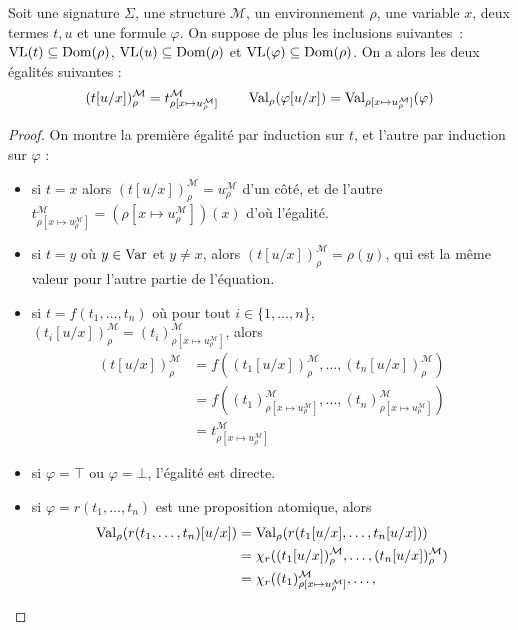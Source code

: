 \begin{proposition}\label{prop.comm.subst.env}
  Soit une signature $\Sigma$, une structure $\mathcal M$, un environnement
  $\rho$, une variable $x$, deux termes $t,u$ et une formule $\varphi$. On
  suppose de plus les inclusions suivantes~: $\operatorname{VL}(t)\subseteq \operatorname{Dom}(\rho)$,
  $\operatorname{VL}(u)\subseteq\operatorname{Dom}(\rho)$ et $\operatorname{VL}(\varphi)\subseteq\operatorname{Dom}(\rho)$. On a alors
  les deux égalités suivantes :
  \[(t[u/x])_\rho^\mathcal M = t^\mathcal M_{\rho[x \mapsto u^\mathcal M_\rho]} \qquad
  \operatorname{Val}_\rho(\varphi[u/x]) = \operatorname{Val}_{\rho[x\mapsto u^\mathcal M_\rho]}(\varphi)\]
\end{proposition}

\begin{proof}
  On montre la première égalité par induction sur $t$, et l'autre par induction
  sur $\varphi$ :
  \begin{itemize}
  \item si $t = x$ alors $(t[u/x])_\rho^\mathcal M = u^\mathcal M_\rho$ d'un côté,
    et de l'autre
    $t^\mathcal M_{\rho[x\mapsto u_\rho^\mathcal M]} =
    (\rho[x\mapsto u_\rho^\mathcal M])(x)$
    d'où l'égalité.
  \item si $t = y$ où $y\in\operatorname{Var}$ et $y\neq x$, alors
    $(t[u/x])_\rho^\mathcal M = \rho(y)$, qui est la même valeur pour l'autre
    partie de l'équation.
  \item si $t = f(t_1,\ldots,t_n)$ où pour tout $i\in\{1,\ldots,n\}$,
    $(t_i[u/x])^\mathcal M_\rho = (t_i)^\mathcal M_{\rho[x\mapsto u^\mathcal M_\rho]}$, alors
    \begin{align*}
      (t[u/x])^\mathcal M_\rho &= f((t_1[u/x])^\mathcal M_\rho,\ldots,
      (t_n[u/x])^\mathcal M_\rho)\\
      &= f((t_1)^\mathcal M_{\rho[x\mapsto u^\mathcal M_\rho]},\ldots,
      (t_n)^\mathcal M_{\rho[x\mapsto u^\mathcal M_\rho]})\\
      &= t^\mathcal M_{\rho[x\mapsto u^\mathcal M_\rho]}
    \end{align*}
  \item si $\varphi = \top$ ou $\varphi = \bot$, l'égalité est directe.
  \item si $\varphi = r(t_1,\ldots,t_n)$ est une proposition atomique, alors
    \begin{align*}
      \Val_\rho(r(t_1,\ldots,t_n)[u/x])
      &= \Val_\rho(r(t_1[u/x],\ldots,t_n[u/x]))\\
      &= \chi_r((t_1[u/x])^\mathcal M_\rho,\ldots,(t_n[u/x])^\mathcal M_\rho)\\
      &= \chi_r((t_1)^\mathcal M_{\rho[x\mapsto u^\mathcal M_\rho]},\ldots,

\end{align*}
\end{itemize}
\end{proof}

